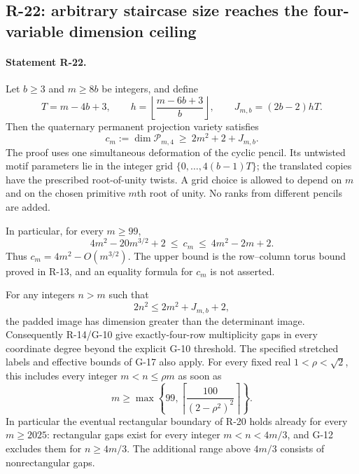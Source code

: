 \documentclass[11pt,a4paper]{article}
\theoremstyle{definition}\newtheorem{definition}{Definition}
\begin{document}
\subsection{R-22: arbitrary staircase size reaches the four-variable dimension ceiling}

\paragraph{Statement R-22.}
Let $b\geq3$ and $m\geq8b$ be integers, and define
\[
 T=m-4b+3,\qquad h=\left\lfloor\frac{m-6b+3}{b}\right\rfloor,
 \qquad J_{m,b}=(2b-2)hT.
\]
Then the quaternary permanent projection variety satisfies
\begin{equation}\label{R22:rank}
 c_m:=\dim\mathcal P_{m,4}\ \geq\ 2m^2+2+J_{m,b}.
\end{equation}
The proof uses one simultaneous deformation of the cyclic pencil.
Its untwisted motif parameters lie in the integer grid
$\{0,\ldots,4(b-1)T\}$; the translated copies have the prescribed
root-of-unity twists. A grid choice is allowed to depend on $m$ and on
the chosen primitive $m$th root of unity. No ranks from
different pencils are added.

In particular, for every $m\geq99$,
\begin{equation}\label{R22:asymptotic}
 4m^2-20m^{3/2}+2\ \leq\ c_m\ \leq\ 4m^2-2m+2.
\end{equation}
Thus $c_m=4m^2-O(m^{3/2})$. The upper bound is the row--column torus
bound proved in R-13, and an equality formula for $c_m$ is not asserted.

For any integers $n>m$ such that
\begin{equation}\label{R22:padding}
 2n^2\leq2m^2+J_{m,b}+2,
\end{equation}
the padded image has dimension greater than the determinant image.
Consequently R-14/G-10 give exactly-four-row multiplicity gaps in every
coordinate degree beyond the explicit G-10 threshold. The specified
stretched labels and effective bounds of G-17 also apply.
For every fixed real $1<\rho<\sqrt2$, this includes every integer
$m<n\leq\rho m$ as soon as
\begin{equation}\label{R22:ratio_threshold}
 m\geq\max\left\{99,
       \left\lceil\frac{100}{(2-\rho^2)^2}\right\rceil\right\}.
\end{equation}
In particular the eventual rectangular boundary of R-20 holds already
for every $m\geq2025$: rectangular gaps exist for every integer
$m<n<4m/3$, and G-12 excludes them for $n\geq4m/3$.
The additional range above $4m/3$ consists of nonrectangular gaps.
\end{document}
